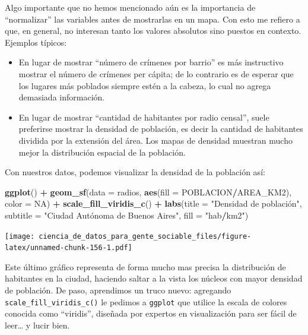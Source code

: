\documentclass[spanish,]{book}
\newenvironment{Shaded}{\begin{snugshade}}{\end{snugshade}}
\newcommand{\DataTypeTok}[1]{\textcolor[rgb]{0.13,0.29,0.53}{#1}}
\newcommand{\KeywordTok}[1]{\textcolor[rgb]{0.13,0.29,0.53}{\textbf{#1}}}
\newcommand{\NormalTok}[1]{#1}
\newcommand{\OperatorTok}[1]{\textcolor[rgb]{0.81,0.36,0.00}{\textbf{#1}}}
\newcommand{\OtherTok}[1]{\textcolor[rgb]{0.56,0.35,0.01}{#1}}
\newcommand{\StringTok}[1]{\textcolor[rgb]{0.31,0.60,0.02}{#1}}
\providecommand{\tightlist}{%
  \setlength{\itemsep}{0pt}\setlength{\parskip}{0pt}}
\begin{document}
Algo importante que no hemos mencionado aún es la importancia de ``normalizar'' las variables antes de mostrarlas en un mapa. Con esto me refiero a que, en general, no interesan tanto los valores absolutos sino puestos en contexto. Ejemplos típicos:

\begin{itemize}
\tightlist
\item
  En lugar de mostrar ``número de crímenes por barrio'' es más instructivo mostrar el número de crímenes per cápita; de lo contrario es de esperar que los lugares más poblados siempre estén a la cabeza, lo cual no agrega demasiada información.\\
\item
  En lugar de mostrar ``cantidad de habitantes por radio censal'', suele preferirse mostrar la densidad de población, es decir la cantidad de habitantes dividida por la extensión del área. Los mapas de densidad muestran mucho mejor la distribución espacial de la población.
\end{itemize}

Con nuestros datos, podemos visualizar la densidad de la población así:

\begin{Shaded}
\begin{Highlighting}[]
\KeywordTok{ggplot}\NormalTok{() }\OperatorTok{+}\StringTok{ }
\StringTok{    }\KeywordTok{geom_sf}\NormalTok{(}\DataTypeTok{data =}\NormalTok{ radios, }\KeywordTok{aes}\NormalTok{(}\DataTypeTok{fill =}\NormalTok{ POBLACION}\OperatorTok{/}\NormalTok{AREA_KM2), }\DataTypeTok{color =} \OtherTok{NA}\NormalTok{) }\OperatorTok{+}
\StringTok{    }\KeywordTok{scale_fill_viridis_c}\NormalTok{() }\OperatorTok{+}
\StringTok{    }\KeywordTok{labs}\NormalTok{(}\DataTypeTok{title =} \StringTok{"Densidad de población",}
\StringTok{         subtitle = "}\NormalTok{Ciudad Autónoma de Buenos Aires}\StringTok{",}
\StringTok{         fill = "}\NormalTok{hab}\OperatorTok{/}\NormalTok{km2}\StringTok{")}
\end{Highlighting}
\end{Shaded}

\texttt{[image: ciencia\_de\_datos\_para\_gente\_sociable\_files/figure-latex/unnamed-chunk-156-1.pdf]}

Este último gráfico representa de forma mucho mas precisa la distribución de habitantes en la ciudad, haciendo saltar a la vista los núcleos con mayor densidad de población. De paso, aprendimos un truco nuevo: agregando \texttt{scale\_fill\_viridis\_c()} le pedimos a \texttt{ggplot} que utilice la escala de colores conocida como ``viridis'', diseñada por expertos en visualización para ser fácil de leer\ldots{} y lucir bien.
\end{document}
